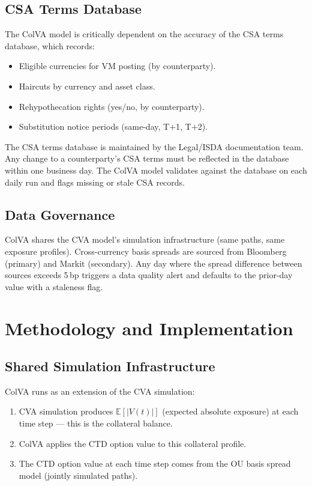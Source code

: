 \documentclass[11pt,a4paper]{article}
\begin{document}
\subsection{CSA Terms Database}

The ColVA model is critically dependent on the accuracy of the CSA terms database, which
records:
\begin{itemize}[leftmargin=*]
  \item Eligible currencies for VM posting (by counterparty).
  \item Haircuts by currency and asset class.
  \item Rehypothecation rights (yes/no, by counterparty).
  \item Substitution notice periods (same-day, T$+$1, T$+$2).
\end{itemize}

The CSA terms database is maintained by the Legal/ISDA documentation team. Any change to a
counterparty's CSA terms must be reflected in the database within one business day. The ColVA
model validates against the database on each daily run and flags missing or stale CSA records.

\subsection{Data Governance}

ColVA shares the CVA model's simulation infrastructure (same paths, same exposure profiles).
Cross-currency basis spreads are sourced from Bloomberg (primary) and Markit (secondary). Any
day where the spread difference between sources exceeds 5\,bp triggers a data quality alert and
defaults to the prior-day value with a staleness flag.

\section{Methodology and Implementation}

\subsection{Shared Simulation Infrastructure}

ColVA runs as an extension of the CVA simulation:
\begin{enumerate}[leftmargin=*]
  \item CVA simulation produces $\mathbb{E}[|V(t)|]$ (expected absolute exposure) at each time step --- this is the collateral balance.
  \item ColVA applies the CTD option value to this collateral profile.
  \item The CTD option value at each time step comes from the OU basis spread model (jointly simulated paths).
\end{enumerate}
\end{document}
